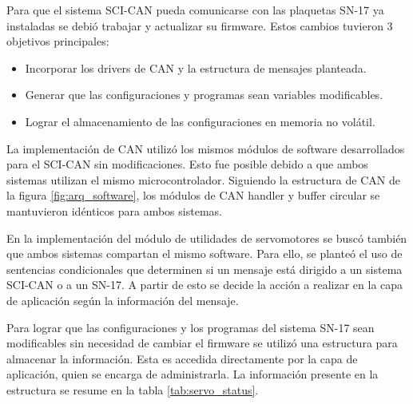 Para que el sistema SCI-CAN pueda comunicarse con las plaquetas SN-17 ya instaladas se debió trabajar y actualizar su firmware. Estos cambios tuvieron 3 objetivos principales:
\begin{itemize}
	\item Incorporar los drivers de CAN y la estructura de mensajes planteada.
	\item Generar que las configuraciones y programas sean variables modificables.
	\item Lograr el almacenamiento de las configuraciones en memoria no volátil.
\end{itemize}

La implementación de CAN utilizó los mismos módulos de software desarrollados para el SCI-CAN sin modificaciones. Esto fue posible debido a que ambos sistemas utilizan el mismo microcontrolador. Siguiendo la estructura de CAN de la figura \ref{fig:arq_software}, los módulos de CAN handler y buffer circular se mantuvieron idénticos para ambos sistemas.

En la implementación del módulo de utilidades de servomotores se buscó también que ambos sistemas compartan el mismo software. Para ello, se planteó el uso de sentencias condicionales que determinen si un mensaje está dirigido a un sistema SCI-CAN o a un SN-17. A partir de esto se decide la acción a realizar en la capa de aplicación según la información del mensaje.

Para lograr que las configuraciones y los programas del sistema SN-17 sean modificables sin necesidad de cambiar el firmware se utilizó una estructura para almacenar la información. Esta es accedida directamente por la capa de aplicación, quien se encarga de administrarla. La información presente en la estructura se resume en la tabla \ref{tab:servo_status}.

